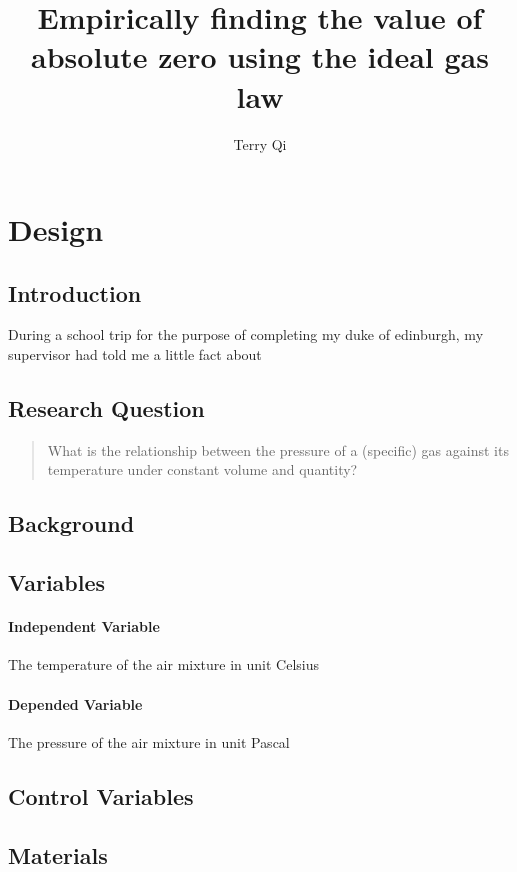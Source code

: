 \documentclass[a4paper,12pt]{article}
\title{Empirically finding the value of absolute zero using the ideal gas law}
\author{Terry Qi}
\begin{document}
\maketitle

\section{Design}
\subsection{Introduction}
During a school trip for the purpose of completing my duke of edinburgh, my supervisor had told me a little fact about    


\subsection{Research Question}
\begin{quote}
    What is the relationship between the pressure of a (specific) gas against its temperature under constant volume and quantity?
\end{quote}

\subsection{Background}



\subsection{Variables}
\paragraph{Independent Variable}
The temperature of the air mixture in unit Celsius

\paragraph{Depended Variable}
The pressure of the air mixture in unit Pascal

\subsection{Control Variables}


\subsection{Materials}
\end{document}
